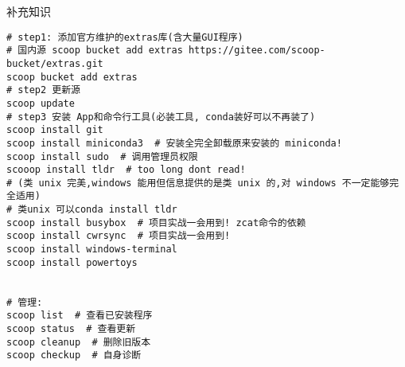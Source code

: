 \begin{frame}[fragile]{补充知识}
    \begin{lstlisting}
# step1: 添加官方维护的extras库(含大量GUI程序)
# 国内源 scoop bucket add extras https://gitee.com/scoop-bucket/extras.git
scoop bucket add extras
# step2 更新源
scoop update
# step3 安装 App和命令行工具(必装工具, conda装好可以不再装了)
scoop install git
scoop install miniconda3  # 安装全完全卸载原来安装的 miniconda!
scoop install sudo  # 调用管理员权限
scooop install tldr  # too long dont read!
# (类 unix 完美,windows 能用但信息提供的是类 unix 的,对 windows 不一定能够完全适用)
# 类unix 可以conda install tldr
scoop install busybox  # 项目实战一会用到! zcat命令的依赖
scoop install cwrsync  # 项目实战一会用到!
scoop install windows-terminal
scoop install powertoys


# 管理:
scoop list  # 查看已安装程序
scoop status  # 查看更新
scoop cleanup  # 删除旧版本
scoop checkup  # 自身诊断
    \end{lstlisting}
\end{frame}

